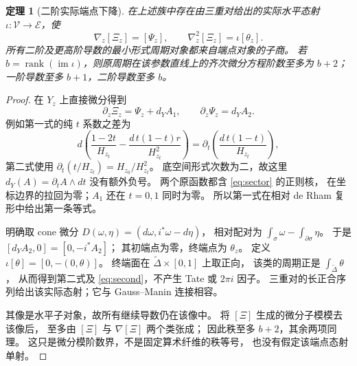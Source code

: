 \documentclass[11pt,a4paper]{ctexart}
\theoremstyle{cnplain}
\newtheorem{theorem}{定理}[section]
\theoremstyle{remark}\newtheorem{remark}[theorem]{注}
\newcommand{\im}{\operatorname{im}}
\begin{document}
\begin{theorem}[二阶实际端点下降]\label{thm:descent}
在上述族中存在由三重对给出的实际水平态射
$\iota:\mathcal V\to\mathcal E$，使
\begin{equation}\label{eq:descent}
 \nabla_z[\Xi_z]=[\Psi_z],\qquad
 \nabla_z^2[\Xi_z]=\iota[\theta_z].
\end{equation}
所有二阶及更高阶导数的最小形式周期对象都来自端点对象的子商。
若 $b=\operatorname{rank}(\im\iota)$，则原周期在该参数直线上的齐次微分方程阶数至多为 $b+2$；
一阶导数至多 $b+1$，二阶导数至多 $b$。
\end{theorem}
\begin{proof}
在 $Y_z$ 上直接微分得到
\begin{equation}\label{eq:exact}
 \partial_z\Xi_z=\Psi_z+d_YA_1,\qquad
 \partial_z\Psi_z=d_YA_2.
\end{equation}
例如第一式的纯 $t$ 系数之差为
\[
 d\left(\frac{1-2t}{H_{z_t}}
          -\frac{d\,t(1-t)r}{H_{z_t}^2}\right)
   =\partial_t\left(\frac{d\,t(1-t)}{H_{z_t}}\right),
\]
第二式使用
$\partial_t(t/H_{z_t})=H_{z_0}/H_{z_t}^2$。
底空间形式次数为二，故这里 $d_Y(A)=\partial_t A\wedge dt$ 没有额外负号。
两个原函数都含 \eqref{eq:sector} 的正则核，
在坐标边界的拉回为零；$A_1$ 还在 $t=0,1$ 同时为零。
所以第一式在相对 de Rham 复形中给出第一条等式。

明确取 cone 微分
$D(\omega,\eta)=(d\omega,i^*\omega-d\eta)$，
相对配对为 $\int_\sigma\omega-\int_{\partial\sigma}\eta$。
于是 $[d_YA_2,0]=[0,-i^*A_2]$；
其初端点为零，终端点为 $\theta_z$。
定义 $\iota[\theta]=[0,-(0,\theta)]$。
终端面在 $\widetilde\Delta\times[0,1]$ 上取正向，
该类的周期正是 $\int_{\widetilde\Delta}\theta$，
从而得到第二式及 \eqref{eq:second}，不产生 Tate 或 $2\pi i$ 因子。
三重对的长正合序列给出该实际态射；它与 Gauss--Manin 连接相容。

其像是水平子对象，故所有继续导数仍在该像中。
将 $[\Xi]$ 生成的微分子模模去该像后，
至多由 $[\Xi]$ 与 $\nabla[\Xi]$ 两个类张成；
因此秩至多 $b+2$，其余两项同理。
这只是微分模阶数界，不是固定算术纤维的秩等号，
也没有假定该端点态射单射。
\end{proof}
\end{document}
